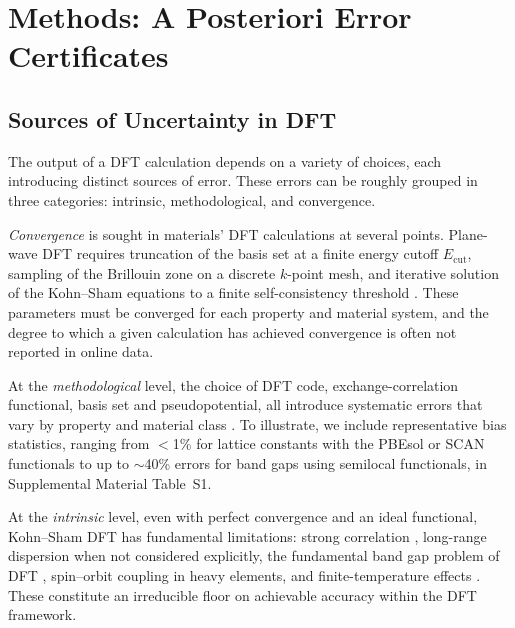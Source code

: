 \documentclass[prb,twocolumn,superscriptaddress,amsmath,amssymb,longbibliography]{revtex4-2}
\newcommand{\Ecut}{E_{\mathrm{cut}}}
\begin{document}
\section{Methods: A Posteriori Error Certificates}
\label{sec:methods}

\subsection{Sources of Uncertainty in DFT}
\label{sec:bg_sources}

The output of a DFT calculation \cite{Hohenberg1964,KohnSham1965} depends on 
a variety of choices, each introducing distinct sources of error. These errors can be roughly grouped in three categories: intrinsic, methodological, and convergence. 

 \emph{Convergence} is sought in materials' DFT calculations at several points. Plane-wave DFT requires truncation of the 
basis set at a finite energy cutoff $\Ecut$, sampling of the Brillouin zone 
on a discrete $k$-point mesh, and iterative solution of the Kohn--Sham 
equations to a finite self-consistency threshold 
\cite{Kresse1996_VASP,Giannozzi2009_QE,Blum2009_FHIaims}. These parameters must be converged for each property and material system, 
and the degree to which a given calculation has achieved convergence is often 
not reported in online data.

At the \emph{methodological} level, the choice of DFT code, exchange-correlation 
functional, basis set and pseudopotential, all introduce systematic errors that vary by property and material class
\cite{Perdew2001_Jacobs_Ladder,Mardirossian2017,Medvedev2017,Sun2015_SCAN,Furness2020_r2SCAN}. To illustrate, we include representative bias statistics, ranging from $<$1\% for 
lattice constants with the PBEsol or SCAN functionals to up to  $\sim$40\% errors for band gaps using 
semilocal functionals, in Supplemental Material Table~S1.

At the \emph{intrinsic} level, even with perfect convergence and an ideal 
functional, Kohn--Sham DFT has fundamental limitations: strong correlation 
\cite{Georges1996_DMFT,Anisimov1997}, 
long-range dispersion when not considered explicitly, the 
fundamental band gap problem of DFT \cite{Perdew1983,Sham1983}, spin--orbit 
coupling in heavy elements, and finite-temperature effects
\cite{Cohen2008,Becke2014,Grimme2010_D3,Klimes2012_vdW}.
These constitute an irreducible floor on achievable accuracy within the DFT 
framework.
\end{document}
